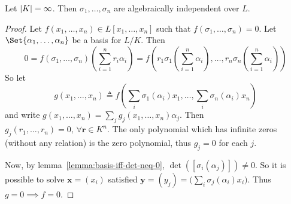 \begin{lemma} \label{lemma:automorphisms-are-alg-indep}
  Let $\lvert K\rvert = \infty$. Then $\sigma_1, \dots, \sigma_n$ are algebraically independent over $L$.

  \begin{proof}
    Let $f(x_1, \dots, x_n) \in L[x_1, \dots, x_n]$ such that $f(\sigma_1, \dots, \sigma_n) = 0$.
    Let $\Set{\alpha_1, \dots, \alpha_n}$ be a basis for $L/K$. Then
    \[ 0 = f(\sigma_1, \dots, \sigma_n)\left( \sum_{i = 1}^n r_i \alpha_i \right)
      = f \left(r_1 \sigma_1 \left( \sum_{i = 1}^n \alpha_i \right), \dots,
        r_n \sigma_n \left( \sum_{i = 1}^n \alpha_i \right) \right) \]
    So let
    \[ g(x_1, \dots, x_n) \triangleq f \left(\sum_i \sigma_1(\alpha_i) x_1,
      \dots, \sum_i \sigma_n(\alpha_i) x_n \right) \]
    and write $g(x_1, \dots, x_n) = \sum_j g_j(x_1, \dots, x_n) \alpha_j$.
    Then $g_j(r_1, \dots, r_n) = 0, \, \forall \bm{r} \in K^n$. The only
    polynomial which has infinite zeros (without any relation) is the zero polynomial,
    thus $g_j = 0$ for each $j$.

    Now, by lemma~\ref{lemma:basis-iff-det-neq-0}, $\det([\sigma_i(\alpha_j)]) \neq 0$.
    So it is possible to solve $\bm{x} = (x_i)$ satisfied
    $\bm{y} = (y_j) = \big( \sum_i \sigma_j(\alpha_i) x_i \big)$.
    Thus $g = 0 \implies f = 0$.
  \end{proof}
\end{lemma}

